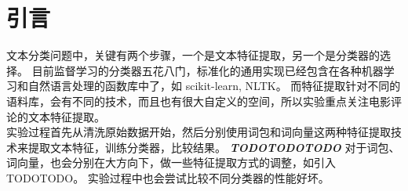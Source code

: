 \section{引言}
文本分类问题中，关键有两个步骤，一个是文本特征提取，另一个是分类器的选择。
目前监督学习的分类器五花八门，标准化的通用实现已经包含在各种机器学习和自然语言处理的函数库中了，如 scikit-learn, NLTK。
而特征提取针对不同的语料库，会有不同的技术，而且也有很大自定义的空间，所以实验重点关注电影评论的文本特征提取。\\
实验过程首先从清洗原始数据开始，然后分别使用词包和词向量这两种特征提取技术来提取文本特征，训练分类器，比较结果。
\textit{\textbf{TODOTODOTODO}}
对于词包、词向量，也会分别在大方向下，做一些特征提取方式的调整，如引入 TODOTODO。
实验过程中也会尝试比较不同分类器的性能好坏。